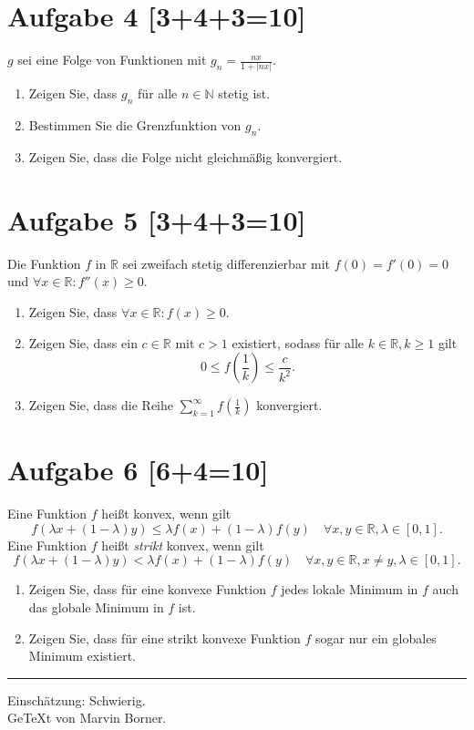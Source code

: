 \documentclass[a4paper, 11pt]{article}
\newcommand{\N}{\mathbb{N}}
\newcommand{\R}{\mathbb{R}}
\begin{document}
\section*{Aufgabe 4 [3+4+3=10]}
$g$ sei eine Folge von Funktionen mit $g_n = \frac{nx}{1+|nx|}$.
\begin{enumerate}[label=(\alph*)]
	\item Zeigen Sie, dass $g_n$ für alle $n\in\N$ stetig ist.
	\item Bestimmen Sie die Grenzfunktion von $g_n$.
	\item Zeigen Sie, dass die Folge nicht gleichmäßig konvergiert.
\end{enumerate}

\section*{Aufgabe 5 [3+4+3=10]}
Die Funktion $f$ in $\R$ sei zweifach stetig differenzierbar mit $f(0) = f'(0) = 0$ und $\forall x\in\R: f''(x) \ge 0$.
\begin{enumerate}[label=(\alph*)]
	\item Zeigen Sie, dass $\forall x\in\R: f(x) \ge 0$.
	\item Zeigen Sie, dass ein $c\in\R$ mit $c>1$ existiert, sodass für alle $k\in\R, k \ge 1$ gilt $$0 \le f\left(\frac{1}{k}\right) \le \frac{c}{k^2}.$$
	\item Zeigen Sie, dass die Reihe $\sum_{k=1}^\infty f\left(\frac{1}{k}\right)$ konvergiert.
\end{enumerate}

\section*{Aufgabe 6 [6+4=10]}
Eine Funktion $f$ heißt konvex, wenn gilt $$f(\lambda x + (1 - \lambda) y) \le \lambda f(x) + (1-\lambda)f(y)\quad\forall x,y\in\R,\lambda\in[0,1].$$
Eine Funktion $f$ heißt \textit{strikt} konvex, wenn gilt $$f(\lambda x + (1 - \lambda) y) < \lambda f(x) + (1-\lambda)f(y)\quad\forall x,y\in\R,x \ne y,\lambda\in[0,1].$$
\begin{enumerate}[label=(\alph*)]
	\item Zeigen Sie, dass für eine konvexe Funktion $f$ jedes lokale Minimum in $f$ auch das globale Minimum in $f$ ist.
	\item Zeigen Sie, dass für eine strikt konvexe Funktion $f$ sogar nur ein globales Minimum existiert.
\end{enumerate}

\noindent\rule[0.5ex]{\linewidth}{1pt}

\begin{center}
	Einschätzung: Schwierig.\\
	GeTeXt von Marvin Borner.
\end{center}
\end{document}
